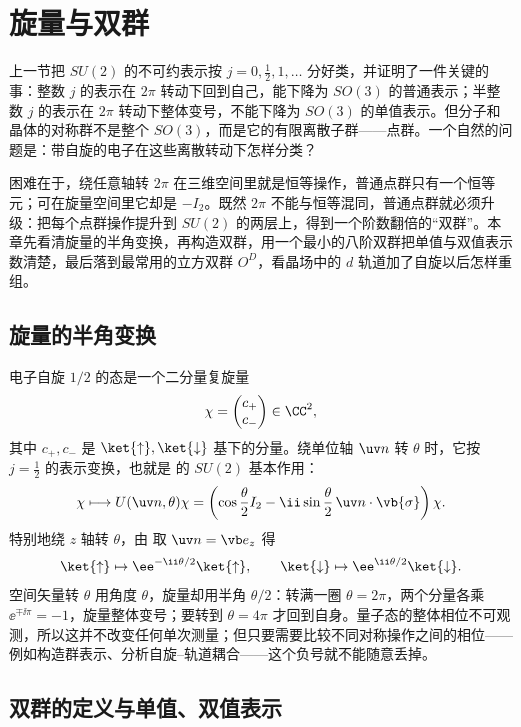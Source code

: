 \section{旋量与双群}
\label{sec:spinors-double-groups}

上一节把 $SU(2)$ 的不可约表示按 $j=0,\tfrac12,1,\dots$ 分好类，并证明了一件关键的事：整数 $j$ 的表示在 $2\pi$ 转动下回到自己，能下降为 $SO(3)$ 的普通表示；半整数 $j$ 的表示在 $2\pi$ 转动下整体变号，不能下降为 $SO(3)$ 的单值表示。但分子和晶体的对称群不是整个 $SO(3)$，而是它的有限离散子群——点群。一个自然的问题是：带自旋的电子在这些离散转动下怎样分类？

困难在于，绕任意轴转 $2\pi$ 在三维空间里就是恒等操作，普通点群只有一个恒等元；可在旋量空间里它却是 $-I_2$。既然 $2\pi$ 不能与恒等混同，普通点群就必须升级：把每个点群操作提升到 $SU(2)$ 的两层上，得到一个阶数翻倍的“双群”。本章先看清旋量的半角变换，再构造双群，用一个最小的八阶双群把单值与双值表示数清楚，最后落到最常用的立方双群 $O^D$，看晶场中的 $d$ 轨道加了自旋以后怎样重组。

\subsection{旋量的半角变换}
\label{sec:spinor-half-angle}

电子自旋 $1/2$ 的态是一个二分量复旋量
\[
\chi=
\begin{pmatrix}c_+\\c_-\end{pmatrix}\in\CC^2,
\]
其中 $c_+,c_-$ 是 $\ket{\uparrow},\ket{\downarrow}$ 基下的分量。绕单位轴 $\uv n$ 转 $\theta$ 时，它按 $j=\tfrac12$ 的表示变换，也就是  的 $SU(2)$ 基本作用：
\[
\chi\longmapsto
U(\uv n,\theta)\chi
=
\left(
\cos\frac\theta2 I_2
-\ii\sin\frac\theta2\,\uv n\cdot\vb{\sigma}
\right)\chi.
\]
特别地绕 $z$ 轴转 $\theta$，由  取 $\uv n=\vb e_z$ 得
\[
\ket{\uparrow}\mapsto \ee^{-\ii\theta/2}\ket{\uparrow},
\qquad
\ket{\downarrow}\mapsto \ee^{\ii\theta/2}\ket{\downarrow}.
\]
空间矢量转 $\theta$ 用角度 $\theta$，旋量却用半角 $\theta/2$：转满一圈 $\theta=2\pi$，两个分量各乘 $\ee^{\mp\ii\pi}=-1$，旋量整体变号；要转到 $\theta=4\pi$ 才回到自身。量子态的整体相位不可观测，所以这并不改变任何单次测量；但只要需要比较不同对称操作之间的相位——例如构造群表示、分析自旋--轨道耦合——这个负号就不能随意丢掉。

\subsection{双群的定义与单值、双值表示}
\label{sec:double-group-definition}

